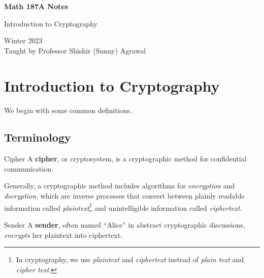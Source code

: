 \documentclass[letterpaper]{article}
\newcommand{\0}{\mathbf{0}}
\begin{document}
\begin{titlepage}
    \begin{center}
        \vspace*{1cm}
            
        \Huge
        \textbf{Math 187A Notes}
            
        \vspace{0.5cm}
        \LARGE
        Introduction to Cryptography
            
        \vspace{1.5cm}
            
        \vfill
            
        Winter 2023\\
        Taught by Professor Shishir (Sunny) Agrawal
    \end{center}
\end{titlepage}


\newpage 

\begingroup
    \renewcommand\contentsname{Table of Contents}
    \tableofcontents
\endgroup

\newpage
{}

\section{Introduction to Cryptography}
We begin with some common definitions.

\subsection{Terminology}
\begin{definition}{Cipher}{}
    A \textbf{cipher}, or cryptosystem, is a cryptographic method for confidential communication. 
\end{definition}
Generally, a cryptographic method includes algorithms for \emph{encryption} and \emph{decryption}, which are inverse processes that convert between plainly readable information called \emph{plaintext}\footnote{In cryptography, we use \emph{plaintext} and \emph{ciphertext} instead of \emph{plain text} and \emph{cipher text}.} and unintelligible information called \emph{ciphertext}.

\begin{definition}{Sender}{}
    A \textbf{sender}, often named ``Alice'' in abstract cryptographic discussions, \emph{encrypts} her plaintext into ciphertext. 
\end{definition}
\end{document}
